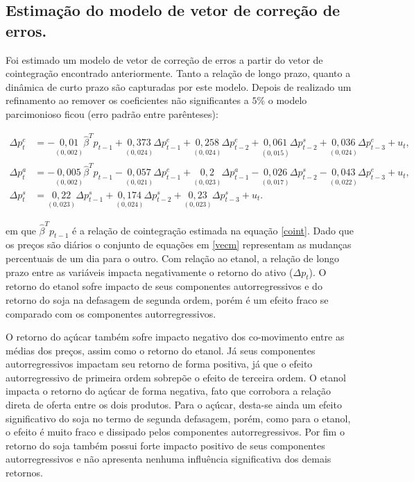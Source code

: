 \subsection{Estimação do modelo de vetor de correção de
erros.}\label{estimacao-do-modelo-de-vetor-de-correcao-de-erros.}

Foi estimado um modelo de vetor de correção de erros a partir do vetor
de cointegração encontrado anteriormente. Tanto a relação de longo prazo,
quanto a dinâmica de curto prazo são capturadas por este modelo. Depois
de realizado um refinamento ao remover os coeficientes não significantes
a \(5\%\) o modelo parcimonioso ficou (erro padrão entre parênteses):

\begin{align}\label{vecm}
\Delta p_t^e &=-\underset{(0,002)}{0,01}\hat{\beta}^Tp_{t-1}+\underset{(0,024)}{0,373}\Delta p_{t-1}^e+\underset{(0,024)}{0,258}\Delta p_{t-2}^e+\underset{(0,015)}{0,061}\Delta p^s_{t-2}+\underset{(0,024)}{0,036}\Delta p^e_{t-3}+u_t,\nonumber\\
\Delta p_t^a &=-\underset{(0,002)}{0,005}\hat{\beta}^Tp_{t-1}-\underset{(0,021)}{0,057}\Delta p^e_{t-1}+\underset{(0,023)}{0,2}\Delta p^a_{t-1}-\underset{(0,017)}{0,026}\Delta p_{t-2}^s-\underset{(0,022)}{0,043}\Delta p_{t-3}^e+u_t,\\
\Delta p_t^s &=\underset{(0,023)}{0,22}\Delta p_{t-1}^s+\underset{(0,024)}{0,174}\Delta p_{t-2}^s+\underset{(0,023)}{0,23}\Delta p_{t-3}^s+u_t.\nonumber
\end{align}

em que \(\hat{\beta}^Tp_{t-1}\) é a relação de cointegração estimada na
equação \eqref{coint}. Dado que os preços são diários o conjunto de
equações em \eqref{vecm} representam as mudanças percentuais de um dia
para o outro. Com relação ao etanol, a relação de longo prazo entre as
variáveis impacta negativamente o retorno do ativo (\(\Delta p_t\)). O
retorno do etanol sofre impacto de seus componentes autorregressivos e
do retorno do soja na defasagem de segunda ordem, porém é um efeito fraco
se comparado com os componentes autorregressivos.

O retorno do açúcar também sofre impacto negativo dos co-movimento entre
as médias dos preços, assim como o retorno do etanol. Já seus
componentes autorregressivos impactam seu retorno de forma positiva, já
que o efeito autorregressivo de primeira ordem sobrepõe o efeito de
terceira ordem. O etanol impacta o retorno do açúcar de forma negativa,
fato que corrobora a relação direta de oferta entre os dois produtos.
Para o açúcar, desta-se ainda um efeito significativo do soja no termo
de segunda defasagem, porém, como para o etanol, o efeito é muito fraco
e dissipado pelos componentes autorregressivos. Por fim o retorno do
soja também possui forte impacto positivo de seus componentes
autorregressivos e não apresenta nenhuma influência significativa dos
demais retornos.

